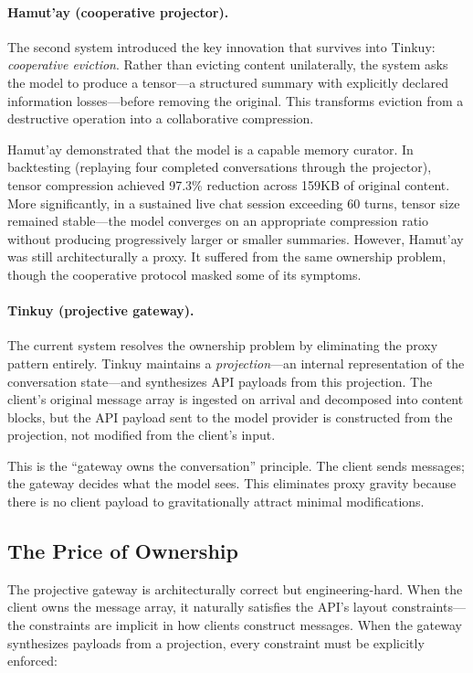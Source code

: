 \documentclass[sigplan,screen,anonymous]{acmart}
\begin{document}
\paragraph{Hamut'ay (cooperative projector).}
The second system introduced the key innovation that survives into
Tinkuy: \emph{cooperative eviction}. Rather than evicting content
unilaterally, the system asks the model to produce a tensor---a
structured summary with explicitly declared information losses---before
removing the original. This transforms eviction from a destructive
operation into a collaborative compression.

Hamut'ay demonstrated that the model is a capable memory curator. In
backtesting (replaying four completed conversations through the
projector), tensor compression achieved 97.3\% reduction across 159KB
of original content. More significantly, in a sustained live chat
session exceeding 60 turns, tensor size remained stable---the model
converges on an appropriate compression ratio without producing
progressively larger or smaller summaries. However, Hamut'ay was still
architecturally a proxy. It suffered from the same ownership problem,
though the cooperative protocol masked some of its symptoms.

\paragraph{Tinkuy (projective gateway).}
The current system resolves the ownership problem by eliminating the
proxy pattern entirely. Tinkuy maintains a \emph{projection}---an
internal representation of the conversation state---and synthesizes
API payloads from this projection. The client's original message array
is ingested on arrival and decomposed into content blocks, but the API
payload sent to the model provider is constructed from the projection,
not modified from the client's input.

This is the ``gateway owns the conversation'' principle. The client
sends messages; the gateway decides what the model sees. This
eliminates proxy gravity because there is no client payload to
gravitationally attract minimal modifications.

\subsection{The Price of Ownership}
\label{sec:price}

The projective gateway is architecturally correct but engineering-hard.
When the client owns the message array, it naturally satisfies the
API's layout constraints---the constraints are implicit in how clients
construct messages. When the gateway synthesizes payloads from a
projection, every constraint must be explicitly enforced:
\end{document}
